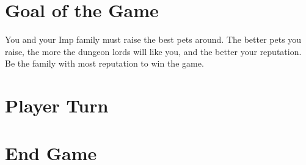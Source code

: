 \documentclass[12pt]{article}
\begin{document}
\begin{mdframed}[style = customFrame]
\begin{multicols*}{2}
\section*{Goal of the Game}
You and your Imp family must raise the best pets around. The better pets you raise, the more the dungeon lords will like you, and the better your reputation. Be the family with most reputation to win the game.
\section*{Player Turn}
\section*{End Game}

\end{multicols*}
\end{mdframed}
\end{document}

